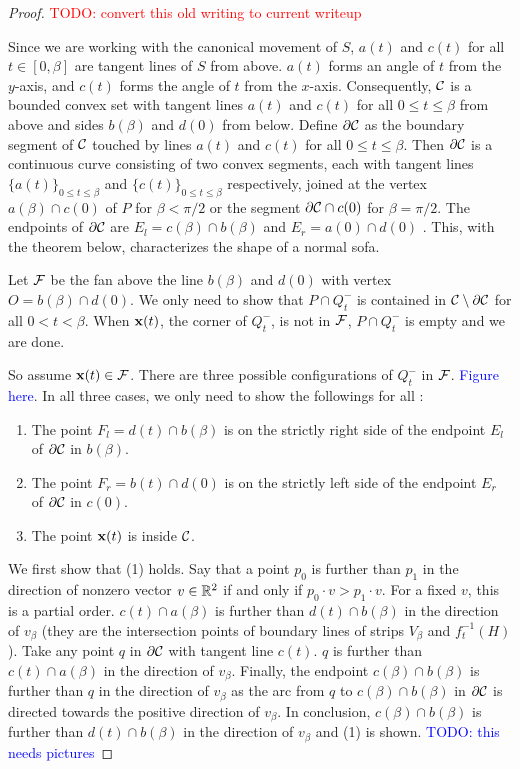 \begin{proof}
\textcolor{red}{TODO: convert this old writing to current writeup}

Since we are working with the canonical movement of $S$, $a(t)$ and $c(t)$ for all $t \in [0, \beta]$ are tangent lines of $S$ from above. 
$a(t)$ forms an angle of $t$ from the $y$-axis, and $c(t)$ forms the angle of $t$ from the $x$-axis.
Consequently, $\mathcal{C}$ is a bounded convex set with tangent lines $a(t)$ and $c(t)$ for all $0 \leq t \leq \beta$ from above and sides $b(\beta)$ and $d(0)$ from below.
Define $\partial \mathcal{C}$ as the boundary segment of $\mathcal{C}$ touched by lines $a(t)$ and $c(t)$ for all $0 \leq t \leq \beta$.
Then $\partial \mathcal{C}$ is a continuous curve consisting of two convex segments, each with tangent lines $\{a(t)\}_{0 \leq t \leq \beta}$ and $\{c(t)\}_{0 \leq t \leq \beta}$ respectively, joined at the vertex $a(\beta) \cap c(0)$ of $P$ for $\beta < \pi / 2$ or the segment $\partial \mathcal{C} \cap c(0)$ for $\beta = \pi / 2$. 
The endpoints of $\partial \mathcal{C}$ are $E_{l} = c(\beta) \cap b(\beta)$ and $E_{r} = a(0) \cap d(0)$ .
This, with the theorem below, characterizes the shape of a normal sofa.

Let $\mathcal{F}$ be the fan above the line $b(\beta)$ and $d(0)$ with vertex $O = b(\beta) \cap d(0)$.
We only need to show that $P \cap Q^-_t$ is contained in $\mathcal{C} \setminus \partial \mathcal{C}$ for all $0 < t < \beta$.
When $\mathbf{x}(t)$, the corner of $Q_t^-$, is not in $\mathcal{F}$, $P \cap Q^-_t$ is empty and we are done.

So assume $\mathbf{x}(t) \in \mathcal{F}$. There are three possible configurations of $Q_t^-$ in $\mathcal{F}$. \textcolor{blue}{Figure here}.
In all three cases, we only need to show the followings for all :
\begin{enumerate}
	\item The point $F_l = d(t) \cap b(\beta)$ is on the strictly right side of the endpoint $E_l$ of $\partial \mathcal{C}$ in $b(\beta)$.
	\item The point $F_r = b(t) \cap d(0)$ is on the strictly left side of the endpoint $E_r$ of $\partial \mathcal{C}$ in $c(0)$.
	\item The point $\mathbf{x}(t)$ is inside $\mathcal{C}$.
\end{enumerate}
We first show that (1) holds.
Say that a point $p_0$ is further than $p_1$ in the direction of nonzero vector $v \in \mathbb{R}^2$ if and only if $p_0 \cdot v > p_1 \cdot v$.
For a fixed $v$, this is a partial order. 
$c(t) \cap a(\beta)$ is further than $d(t) \cap b(\beta)$ in the direction of $v_\beta$ (they are the intersection points of boundary lines of strips $V_\beta$ and $f^{-1}_t(H)$).
Take any point $q$ in $\partial \mathcal{C}$ with tangent line $c(t)$. 
$q$ is further than $c(t) \cap a(\beta)$ in the direction of $v_\beta$.
Finally, the endpoint $c(\beta) \cap b(\beta)$ is further than $q$ in the direction of $v_\beta$ as the arc from $q$ to $c(\beta) \cap b(\beta)$ in $\partial \mathcal{C}$ is directed towards the positive direction of $v_\beta$.
In conclusion, $c(\beta) \cap b(\beta)$ is further than $d(t) \cap b(\beta)$ in the direction of $v_\beta$ and (1) is shown.
\textcolor{blue}{TODO: this needs pictures}


\end{proof}
